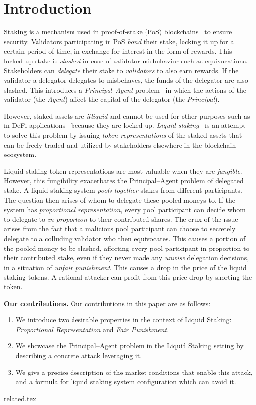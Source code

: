 \section{Introduction}

Staking is a mechanism used in proof-of-stake (PoS)
blockchains~\cite{2018tendermint,buchman2016tendermint,ouroboros,algorand,casper}
to ensure security. Validators participating in PoS
\emph{bond} their stake, locking it up for a certain period of time,
in exchange for interest in the form of rewards.
This locked-up stake is \emph{slashed} in case of validator misbehavior
such as equivocations.
Stakeholders can \emph{delegate} their stake to \emph{validators} to also
earn rewards. If the validator a delegator delegates to misbehaves,
the funds of the delegator are also slashed. This introduces a
\emph{Principal--Agent} problem~\cite{jensen1976,wealthofnations}
in which the actions of the validator (the \emph{Agent})
affect the capital of the delegator (the \emph{Principal}).

However, staked assets are \emph{illiquid} and cannot be used for
other purposes such as in DeFi applications~\cite{defi-sok}
because they are locked up.
\emph{Liquid staking}~\cite{liquid-staking-report}
is an attempt to solve this problem by issuing
\emph{token representations} of the staked assets that can be freely traded
and utilized by stakeholders elsewhere in the blockchain ecosystem.

Liquid staking token representations are most valuable when they are
\emph{fungible}. However, this fungibility exacerbates the Principal--Agent
problem of delegated stake.
A liquid staking system \emph{pools together} stakes from different participants.
The question then arises of whom to delegate these pooled moneys to.
If the system has \emph{proportional representation}, every pool participant
can decide whom to delegate to \emph{in proportion} to their contributed shares.
The crux of the issue arises from the fact
that a malicious pool participant can choose to secretely delegate to
a colluding validator who then equivocates. This causes a portion
of the pooled money to be slashed, affecting every pool participant
in proportion to their contributed stake, even if they never made
any \emph{unwise} delegation decisions, in a situation of
\emph{unfair punishment}. This causes a drop in the price of the
liquid staking tokens. A rational attacker can profit from this price
drop by shorting the token.

\noindent
\textbf{Our contributions.} Our contributions in this paper are as follows:
\begin{enumerate}
    \item We introduce two desirable properties in the context of Liquid Staking: \emph{Proportional Representation} and \emph{Fair Punishment}.
    \item We showcase the Principal--Agent problem in the Liquid Staking setting by describing a concrete attack leveraging it.
    \item We give a precise description of the market conditions that enable this attack, and a formula for liquid staking system configuration which can avoid it.
\end{enumerate}

{related.tex}
